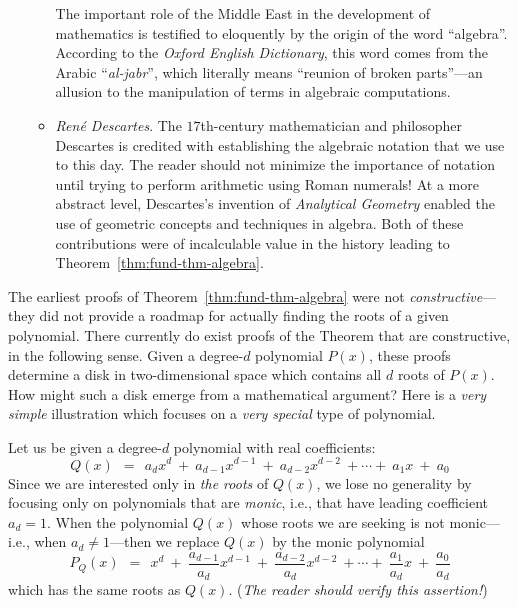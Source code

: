 \begin{itemize}
\begin{itemize}
{\begin{minipage}{0.88\textwidth}
\smallskip

The important role of the Middle East in the development of mathematics is testified to eloquently by the origin of the word ``algebra''.  According to the {\it Oxford English Dictionary}, this word comes from the Arabic ``{\it al-jabr}'', which literally means ``reunion of broken parts''---an allusion to the manipulation of terms in algebraic computations.
\end{minipage}  }

\bigskip

   \medskip\item
{\it Ren\'{e} Descartes}.  The $17$th-century mathematician and philosopher Descartes is credited with establishing the algebraic notation that we use to this day.  The reader should not minimize the importance of notation until trying to perform arithmetic using Roman numerals!  At a more abstract level, Descartes's invention of {\em Analytical Geometry} enabled the use of geometric concepts and techniques in algebra.  Both of these contributions were of incalculable value in the history leading to Theorem~\ref{thm:fund-thm-algebra}.
   \end{itemize}
\end{itemize}

\medskip

The earliest proofs of Theorem~\ref{thm:fund-thm-algebra} were not {\em constructive}---they did not provide a roadmap for actually finding the roots of a given polynomial.  There currently do exist proofs of the Theorem that are constructive, in the following sense.  Given a degree-$d$ polynomial $P(x)$, these proofs determine a disk in two-dimensional space which contains all $d$ roots of $P(x)$.  How might such a disk emerge from a mathematical argument?  Here is a {\em very simple} illustration which focuses on a {\em very special} type of polynomial.

Let us be given a degree-$d$ polynomial with real coefficients:
\[ Q(x) \ \ = \ \ a_d x^d \ + \ a_{d-1} x^{d-1} \ + \ a_{d-2} x^{d-2} \ + \cdots + \ a_1 x \ + \ a_0
\]
Since we are interested only in {\em the roots} of $Q(x)$, we lose no generality by focusing only on polynomials that are {\em monic}, i.e., that have leading coefficient $a_d = 1$.  When the polynomial $Q(x)$ whose roots we are seeking is not monic---i.e., when $a_d \neq 1$---then we replace $Q(x)$ by the monic polynomial
\[ P_Q(x) \ \ = \ \ x^d \ + \ \frac{a_{d-1}}{a_d} x^{d-1} \ + \ \frac{a_{d-2}}{a_d} x^{d-2}
\ + \cdots + \ \frac{a_1}{a_d} x \ + \ \frac{a_0}{a_d}
\]
which has the same roots as $Q(x)$.  ({\em The reader should verify this assertion!})  

